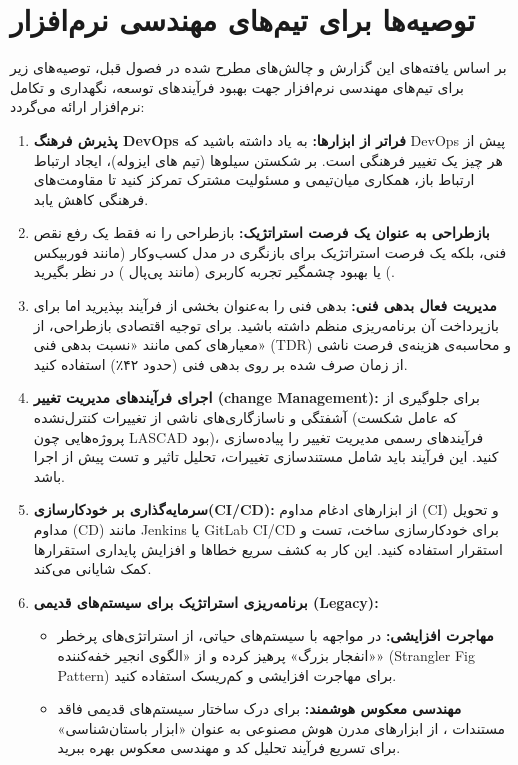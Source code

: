 \section{توصیه‌ها برای تیم‌های مهندسی نرم‌افزار}
\label{sec:ch6-recommendations}

بر اساس یافته‌های این گزارش و چالش‌های مطرح شده در فصول قبل، توصیه‌های زیر برای تیم‌های مهندسی نرم‌افزار جهت بهبود فرآیندهای توسعه، نگهداری و تکامل نرم‌افزار ارائه می‌گردد:

\begin{enumerate}
    \item \textbf{پذیرش فرهنگ DevOps فراتر از ابزارها:} به یاد داشته باشید که DevOps پیش از هر چیز یک تغییر فرهنگی است. بر شکستن سیلوها (تیم های ایزوله)، ایجاد ارتباط ارتباط باز، همکاری میان‌تیمی و مسئولیت مشترک تمرکز کنید تا مقاومت‌های فرهنگی کاهش یابد.
    \item \textbf{بازطراحی به عنوان یک فرصت استراتژیک:} بازطراحی را نه فقط یک رفع نقص فنی، بلکه یک فرصت استراتژیک برای بازنگری در مدل کسب‌وکار (مانند فوربیکس ) یا بهبود چشمگیر تجربه کاربری (مانند پی‌پال ) در نظر بگیرید.
    \item \textbf{مدیریت فعال بدهی فنی:} بدهی فنی را به‌عنوان بخشی از فرآیند بپذیرید اما برای بازپرداخت آن برنامه‌ریزی منظم داشته باشید. برای توجیه اقتصادی بازطراحی، از معیارهای کمی مانند «نسبت بدهی فنی» (TDR) و محاسبه‌ی هزینه‌ی فرصت ناشی از زمان صرف شده بر روی بدهی فنی (حدود ۴۲٪) استفاده کنید.
    \item \textbf{اجرای فرآیندهای مدیریت تغییر (change Management):} برای جلوگیری از آشفتگی و ناسازگاری‌های ناشی از تغییرات کنترل‌نشده (که عامل شکست پروژه‌هایی چون LASCAD بود)، فرآیندهای رسمی مدیریت تغییر را پیاده‌سازی کنید. این فرآیند باید شامل مستندسازی تغییرات، تحلیل تاثیر و تست پیش از اجرا باشد.
    \item \textbf{سرمایه‌گذاری بر خودکارسازی(CI/CD):} از ابزارهای ادغام مداوم (CI) و تحویل مداوم (CD) مانند Jenkins یا GitLab CI/CD برای خودکارسازی ساخت، تست و استقرار استفاده کنید. این کار به کشف سریع خطاها و افزایش پایداری استقرارها کمک شایانی می‌کند.
    \item \textbf{برنامه‌ریزی استراتژیک برای سیستم‌های قدیمی (Legacy):}
    \begin{itemize}
        \item \textbf{مهاجرت افزایشی:} در مواجهه با سیستم‌های حیاتی، از استراتژی‌های پرخطر «انفجار بزرگ» پرهیز کرده و از «الگوی انجیر خفه‌کننده» (Strangler Fig Pattern) برای مهاجرت افزایشی و کم‌ریسک استفاده کنید.
        \item \textbf{مهندسی معکوس هوشمند:} برای درک ساختار سیستم‌های قدیمی فاقد مستندات ، از ابزارهای مدرن هوش مصنوعی به عنوان «ابزار باستان‌شناسی» برای تسریع فرآیند تحلیل کد و مهندسی معکوس بهره ببرید.

\end{itemize}
\end{enumerate}
